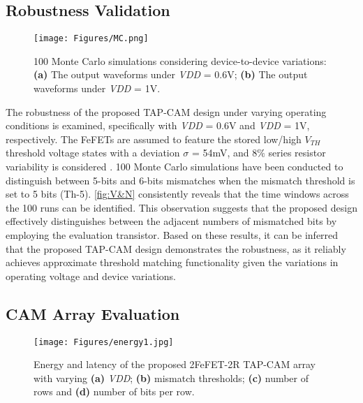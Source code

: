 \subsection{Robustness Validation}

\begin{figure}
    \centering
    \texttt{[image: Figures/MC.png]}
    \caption{100 Monte Carlo simulations considering device-to-device variations: \textbf{(a)} The output waveforms under \textit{VDD} = 0.6V; \textbf{(b)} The output waveforms under \textit{VDD} = 1V.}
\label{fig:MC}
\end{figure}

The robustness of the proposed TAP-CAM design under varying operating conditions is examined, specifically with \textit{VDD} = 0.6V and \textit{VDD} = 1V, respectively. 
The FeFETs are assumed to feature the stored low/high $\textit{V}_\textit{TH}$ threshold voltage states with a deviation $\sigma$ = 54mV, and 8$\%$   series resistor variability is considered \cite{area}.
100 Monte Carlo simulations have been conducted  to distinguish between 5-bits and 6-bits mismatches when the mismatch threshold is set to 5 bits (Th-5). 
\autoref{fig:V&N} consistently reveals that the time windows across the 100 runs can be identified.
This observation suggests that the proposed design effectively distinguishes between the adjacent numbers of mismatched bits by employing the evaluation transistor. 
Based on these results, it can be inferred that the proposed TAP-CAM design  demonstrates the robustness, as it reliably achieves approximate threshold matching functionality given the variations in operating voltage and device variations.



\subsection{CAM Array Evaluation}
\begin{figure}
    \centering
    \texttt{[image: Figures/energy1.jpg]}
    \caption{Energy and latency of the proposed 2FeFET-2R TAP-CAM array
with varying \textbf{(a)} \textit{VDD}; \textbf{(b)} mismatch thresholds; \textbf{(c)} number of rows and \textbf{(d)} number of bits per row.}
\label{fig:V&N}
\end{figure}

